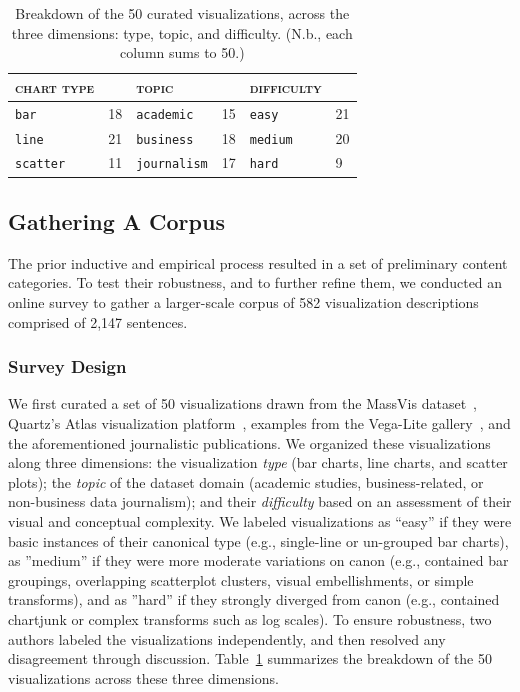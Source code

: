 \begin{table}
\caption{Breakdown of the 50 curated visualizations, across the three dimensions: type, topic, and difficulty. (N.b., each column sums to 50.)}
\centering

\begin{tabular}{llllll}
\hline
\textsc{chart type} & & \textsc{topic} & & \textsc{difficulty}  & \\
\hline
\texttt{bar} & 18 & \texttt{academic} & 15 & \texttt{easy} & 21\\
\texttt{line} & 21 & \texttt{business} & 18 & \texttt{medium} & 20\\
\texttt{scatter} & 11 & \texttt{journalism} & 17 & \texttt{hard} & 9\\
\hline
\end{tabular}
\label{table:curatedset}
\vspace{-5mm}
\end{table}

\subsection{Gathering A Corpus}

The prior inductive and empirical process resulted in a set of preliminary content categories.
To test their robustness, and to further refine them, we conducted an online survey to gather a larger-scale corpus of {582} visualization descriptions comprised of {2,147} sentences.

\subsubsection{Survey Design}
\label{section:study1design}

We first curated a set of 50 visualizations drawn from the MassVis dataset~\cite{borkin_what_2013, borkin_beyond_2016}, Quartz’s Atlas visualization platform~\cite{poco_reverse-engineering_2017}, examples from the Vega-Lite gallery~\cite{satyanarayan_vega-lite_2017}, and the aforementioned journalistic publications.
We organized these visualizations along three dimensions: the visualization \emph{type} (bar charts, line charts, and scatter plots); the \emph{topic} of the dataset domain (academic studies, business-related, or non-business data journalism); and their \emph{difficulty} based on an assessment of their visual and conceptual complexity.
We labeled visualizations as ``easy'' if they were basic instances of their canonical type (e.g., single-line or un-grouped bar charts), as ''medium'' if they were more moderate variations on canon (e.g., contained bar groupings, overlapping scatterplot clusters, visual embellishments, or simple transforms), and as ''hard'' if they strongly diverged from canon (e.g., contained chartjunk or complex transforms such as log scales).
To ensure robustness, two authors labeled the visualizations independently, and then resolved any disagreement through discussion.
Table~\ref{table:curatedset} summarizes the breakdown of the 50 visualizations across these three dimensions.

